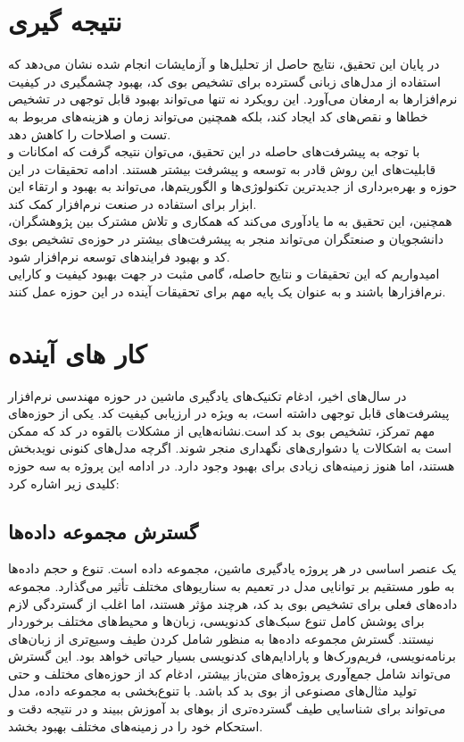 
\section{نتیجه گیری}

در پایان این تحقیق، نتایج حاصل از تحلیل‌ها و آزمایشات انجام شده نشان می‌دهد که استفاده از مدل‌های زبانی گسترده برای تشخیص بوی کد، بهبود چشمگیری در کیفیت نرم‌افزارها به ارمغان می‌آورد. این رویکرد نه تنها می‌تواند بهبود قابل توجهی در تشخیص خطاها و نقص‌های کد ایجاد کند، بلکه همچنین می‌تواند زمان و هزینه‌های مربوط به تست و اصلاحات را کاهش دهد.
\\
با توجه به پیشرفت‌های حاصله در این تحقیق، می‌توان نتیجه گرفت که امکانات و قابلیت‌های این روش قادر به توسعه و پیشرفت بیشتر هستند. ادامه تحقیقات در این حوزه و بهره‌برداری از جدیدترین تکنولوژی‌ها و الگوریتم‌ها، می‌تواند به بهبود و ارتقاء این ابزار برای استفاده در صنعت نرم‌افزار کمک کند.
\\
همچنین، این تحقیق به ما یادآوری می‌کند که همکاری و تلاش مشترک بین پژوهشگران، دانشجویان و صنعتگران می‌تواند منجر به پیشرفت‌های بیشتر در حوزه‌ی تشخیص بوی کد و بهبود فرایندهای توسعه نرم‌افزار شود.
\\
امیدواریم که این تحقیقات و نتایج حاصله، گامی مثبت در جهت بهبود کیفیت و کارایی نرم‌افزارها باشند و به عنوان یک پایه مهم برای تحقیقات آینده در این حوزه عمل کنند.


\section{کار های آینده}

در سال‌های اخیر، ادغام تکنیک‌های یادگیری ماشین در حوزه مهندسی نرم‌افزار پیشرفت‌های قابل توجهی داشته است، به ویژه در ارزیابی کیفیت کد. یکی از حوزه‌های مهم تمرکز، تشخیص بوی بد کد است.نشانه‌هایی از مشکلات بالقوه در کد که ممکن است به اشکالات یا دشواری‌های نگهداری منجر شوند. اگرچه مدل‌های کنونی نویدبخش هستند، اما هنوز زمینه‌های زیادی برای بهبود وجود دارد. در ادامه این پروژه به سه حوزه کلیدی زیر اشاره کرد:

\subsection{گسترش مجموعه داده‌ها}
یک عنصر اساسی در هر پروژه یادگیری ماشین، مجموعه داده است. تنوع و حجم داده‌ها به طور مستقیم بر توانایی مدل در تعمیم به سناریوهای مختلف تأثیر می‌گذارد. مجموعه داده‌های فعلی برای تشخیص بوی بد کد، هرچند مؤثر هستند، اما اغلب از گستردگی لازم برای پوشش کامل تنوع سبک‌های کدنویسی، زبان‌ها و محیط‌های مختلف برخوردار نیستند. گسترش مجموعه داده‌ها به منظور شامل کردن طیف وسیع‌تری از زبان‌های برنامه‌نویسی، فریم‌ورک‌ها و پارادایم‌های کدنویسی بسیار حیاتی خواهد بود. این گسترش می‌تواند شامل جمع‌آوری پروژه‌های متن‌باز بیشتر، ادغام کد از حوزه‌های مختلف و حتی تولید مثال‌های مصنوعی از بوی بد کد باشد. با تنوع‌بخشی به مجموعه داده، مدل می‌تواند برای شناسایی طیف گسترده‌تری از بوهای بد آموزش ببیند و در نتیجه دقت و استحکام خود را در زمینه‌های مختلف بهبود بخشد.

